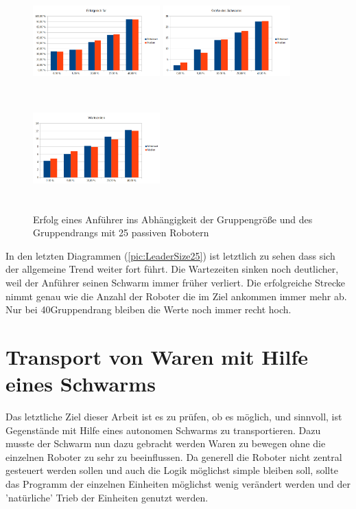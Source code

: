 \begin{figure}
	\includegraphics[width=4.9cm, height=4cm]{graphics/Statistics/Leader/FlockSize/25_1.png}
	\includegraphics[width=4.9cm, height=4cm]{graphics/Statistics/Leader/FlockSize/25_2.png}
	\includegraphics[width=4.9cm, height=4cm]{graphics/Statistics/Leader/FlockSize/25_3.png}
	\caption{Erfolg eines Anführer ins Abhängigkeit der Gruppengröße und des Gruppendrangs mit 25 passiven Robotern}
	\label{pic:LeaderSize25}
\end{figure}

In den letzten Diagrammen (\autoref{pic:LeaderSize25}) ist letztlich zu sehen dass sich der allgemeine Trend weiter fort führt. Die Wartezeiten sinken noch deutlicher, weil der Anführer seinen Schwarm immer früher verliert. Die erfolgreiche Strecke nimmt genau wie die Anzahl der Roboter die im Ziel ankommen immer mehr ab. Nur bei 40\per Gruppendrang bleiben die Werte noch immer recht hoch.


\section{Transport von Waren mit Hilfe eines Schwarms}

Das letztliche Ziel dieser Arbeit ist es zu prüfen, ob es möglich, und sinnvoll, ist Gegenstände mit Hilfe eines autonomen Schwarms zu transportieren. Dazu musste der Schwarm nun dazu gebracht werden Waren zu bewegen ohne die einzelnen Roboter zu sehr zu beeinflussen. Da generell die Roboter nicht zentral gesteuert werden sollen und auch die Logik möglichst simple bleiben soll, sollte das Programm der einzelnen Einheiten möglichst wenig verändert werden und der 'natürliche' Trieb der Einheiten genutzt werden.

